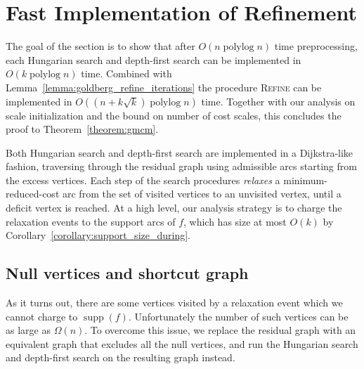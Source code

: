 \documentclass[a4paper,UKenglish]{socg-lipics-v2018}
\makeatletter
\def\note#1{\textcolor{red}{{#1}}}
\def\polylog{\mathop{\mathrm{polylog}}}
\def\supp{\operatorname{supp}}
\theoremstyle{plain}
\numberwithin{figure}{section}
\def\EMPH#1{\textcolor{BrickRed}{{\emph{#1}}}}
\def\n@te#1{\textsf{\boldmath \textbf{$\langle\!\langle$#1$\rangle\!\rangle$}}\leavevmode}
\def\note#1{\textcolor{red}{\n@te{#1}}}
\makeatother
\begin{document}
\section{Fast Implementation of Refinement}
\label{S:implementation}

The goal of the section is to show that after $O(n \polylog n)$ time preprocessing, each Hungarian search and depth-first search can be implemented in $O(k \polylog n)$ time.
%
Combined with Lemma~\ref{lemma:goldberg_refine_iterations}
the procedure \textsc{Refine} can be implemented in $O((n+k\sqrt{k}) \polylog n)$ time.  Together with our analysis on scale initialization and the bound on number of cost scales, this concludes the proof to Theorem~\ref{theorem:gmcm}.

Both Hungarian search and depth-first search are implemented in a Dijkstra-like fashion, traversing through the residual graph using admissible arcs starting from the excess vertices.
Each step of the search procedures \EMPH{relaxes} a minimum-reduced-cost arc from the set of visited vertices to an unvisited vertex, until a deficit vertex is reached.
%
At a high level, our analysis strategy is to charge the relaxation events to the support arcs of $f$, which has size at most $O(k)$ by Corollary~\ref{corollary:support_size_during}.

\subsection{Null vertices and shortcut graph}


As it turns out, there are some vertices visited by a relaxation event which we cannot charge to $\supp(f)$.
Unfortunately the number of such vertices can be as large as $\Omega(n)$.
%
To overcome this issue, we replace the residual graph with an equivalent graph that excludes all the null vertices,
and run the Hungarian search and depth-first search on the resulting graph instead.
\end{document}
